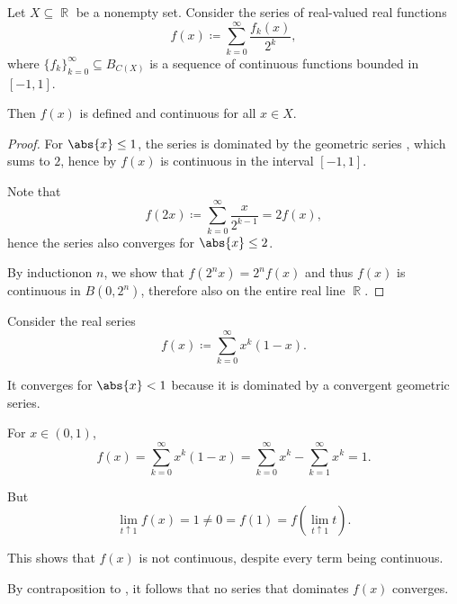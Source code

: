 \begin{corollary}\label{thm:continuous_function_series_powers_of_two}
  Let \( X \subseteq \BbbR \) be a nonempty set. Consider the series of real-valued real functions
  \begin{equation}\label{thm:continuous_function_series_powers_of_two/series}
    f(x) \coloneqq \sum_{k=0}^\infty \frac {f_k(x)} {2^k},
  \end{equation}
  where \( \{ f_k \}_{k=0}^\infty \subseteq B_{C(X)} \) is a sequence of continuous functions bounded in \( [-1, 1] \).

  Then \( f(x) \) is defined and continuous for all \( x \in X \).
\end{corollary}
\begin{proof}
  For \( \abs{x} \leq 1 \), the series is dominated by the geometric series , which sums to \( 2 \), hence by  \( f(x) \) is continuous in the interval \( [-1, 1] \).

  Note that
  \begin{equation*}
    f(2x) \coloneqq \sum_{k=0}^\infty \frac x {2^{k-1}} = 2 f(x),
  \end{equation*}
  hence the series  also converges for \( \abs{x} \leq 2 \).

  By induction\IND on \( n \), we show that \( f(2^n x) = 2^n f(x) \) and thus \( f(x) \) is continuous in \( B(0, 2^n) \), therefore also on the entire real line \( \BbbR \).
\end{proof}

\begin{example}\label{thm:weierstrass_series_criterion/counterexample}\mcite\cite[]{Фихтенгольц1968/2}
  Consider the real series
  \begin{equation*}
    f(x) \coloneqq \sum_{k=0}^\infty x^k (1 - x).
  \end{equation*}

  It converges for \( \abs{x} < 1 \) because it is dominated by a convergent geometric series.

  For \( x \in (0, 1) \),
  \begin{equation*}
    f(x)
    =
    \sum_{k=0}^\infty x^k (1 - x)
    =
    \sum_{k=0}^\infty x^k - \sum_{k=1}^\infty x^k
    =
    1.
  \end{equation*}

  But
  \begin{equation*}
    \lim_{t \uparrow 1} f(x) = 1 \neq 0 = f(1) = f(\lim_{t \uparrow 1} t).
  \end{equation*}

  This shows that \( f(x) \) is not continuous, despite every term being continuous.

  By contraposition to , it follows that no series that dominates \( f(x) \) converges.
\end{example}

